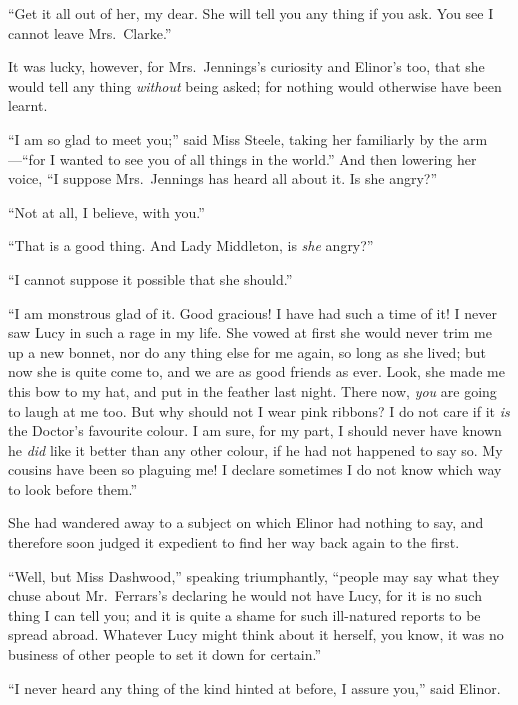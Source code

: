 ``Get it all out of her, my dear.  She will tell you
any thing if you ask.  You see I cannot leave Mrs.\ Clarke.''

It was lucky, however, for Mrs.\ Jennings's curiosity
and Elinor's too, that she would tell any thing \emph{without}
being asked; for nothing would otherwise have been learnt.

``I am so glad to meet you;'' said Miss Steele,
taking her familiarly by the arm---``for I wanted to see you
of all things in the world.''  And then lowering her voice,
``I suppose Mrs.\ Jennings has heard all about it.
Is she angry?''

``Not at all, I believe, with you.''

``That is a good thing.  And Lady Middleton, is \emph{she} angry?''

``I cannot suppose it possible that she should.''

``I am monstrous glad of it.  Good gracious!  I have
had such a time of it!  I never saw Lucy in such a rage
in my life.  She vowed at first she would never trim me
up a new bonnet, nor do any thing else for me again,
so long as she lived; but now she is quite come to,
and we are as good friends as ever.  Look, she made me
this bow to my hat, and put in the feather last night.
There now, \emph{you} are going to laugh at me too.  But why
should not I wear pink ribbons?  I do not care if it \emph{is}
the Doctor's favourite colour.  I am sure, for my part,
I should never have known he \emph{did} like it better than
any other colour, if he had not happened to say so.
My cousins have been so plaguing me!  I declare sometimes
I do not know which way to look before them.''

She had wandered away to a subject on which Elinor
had nothing to say, and therefore soon judged it expedient
to find her way back again to the first.

``Well, but Miss Dashwood,'' speaking triumphantly,
``people may say what they chuse about Mr.\ Ferrars's
declaring he would not have Lucy, for it is no such thing
I can tell you; and it is quite a shame for such ill-natured
reports to be spread abroad.  Whatever Lucy might think
about it herself, you know, it was no business of other
people to set it down for certain.''

``I never heard any thing of the kind hinted at before,
I assure you,'' said Elinor.

